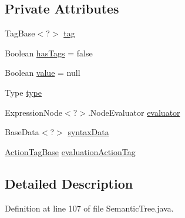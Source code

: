 \subsection*{Private Attributes}
\begin{DoxyCompactItemize}
\item 
Tag\-Base$<$?$>$ \hyperlink{classit_1_1emarolab_1_1cagg_1_1core_1_1evaluation_1_1semanticGrammar_1_1SemanticTree_1_1SemanticNode_a9bd291cd1cb604f9abb191441387b07b}{tag}
\item 
Boolean \hyperlink{classit_1_1emarolab_1_1cagg_1_1core_1_1evaluation_1_1semanticGrammar_1_1SemanticTree_1_1SemanticNode_a2fd76370326531ae7e9b4dcae60c80b8}{has\-Tags} = false
\item 
Boolean \hyperlink{classit_1_1emarolab_1_1cagg_1_1core_1_1evaluation_1_1semanticGrammar_1_1SemanticTree_1_1SemanticNode_ac0c4c50ff85ee767e4b12b97ab3ab686}{value} = null
\item 
Type \hyperlink{classit_1_1emarolab_1_1cagg_1_1core_1_1evaluation_1_1semanticGrammar_1_1SemanticTree_1_1SemanticNode_adbb49d4129159898728fc63dd3224c1e}{type}
\item 
Expression\-Node$<$?$>$.Node\-Evaluator \hyperlink{classit_1_1emarolab_1_1cagg_1_1core_1_1evaluation_1_1semanticGrammar_1_1SemanticTree_1_1SemanticNode_af8720543ca91859b9a70dd6f7f8ce9a0}{evaluator}
\item 
Base\-Data$<$?$>$ \hyperlink{classit_1_1emarolab_1_1cagg_1_1core_1_1evaluation_1_1semanticGrammar_1_1SemanticTree_1_1SemanticNode_ac8d3aff7b6fbb8cc2d7f3a3aa1c4d5f1}{syntax\-Data}
\item 
\hyperlink{classit_1_1emarolab_1_1cagg_1_1core_1_1evaluation_1_1semanticGrammar_1_1syntaxCompiler_1_1ActionTagBase}{Action\-Tag\-Base} \hyperlink{classit_1_1emarolab_1_1cagg_1_1core_1_1evaluation_1_1semanticGrammar_1_1SemanticTree_1_1SemanticNode_a09f790b1a79f800c26dd07f6cbfa944c}{evaluation\-Action\-Tag}
\end{DoxyCompactItemize}


\subsection{Detailed Description}


Definition at line 107 of file Semantic\-Tree.\-java.



